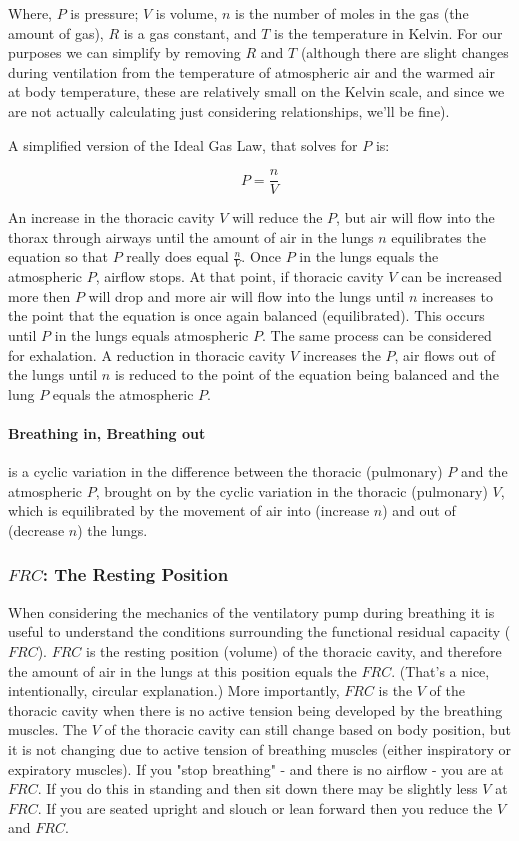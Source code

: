 Where, $P$ is pressure; $V$ is volume, $n$ is the number of moles in the gas (the amount of gas), $R$ is a gas constant, and $T$ is the temperature in Kelvin. For our purposes we can simplify by removing $R$ and $T$ (although there are slight changes during ventilation from the temperature of atmospheric air and the warmed air at body temperature, these are relatively small on the Kelvin scale, and since we are not actually calculating just considering relationships, we'll be fine).

A simplified version of the Ideal Gas Law, that solves for $P$ is:

\begin{equation}
    P = \frac{n}{V}
\end{equation}

An increase in the thoracic cavity $V$ will reduce the $P$, but air will flow into the thorax through airways until the amount of air in the lungs $n$ equilibrates the equation so that $P$ really does equal $\frac{n}{V}$. Once $P$ in the lungs equals the atmospheric $P$, airflow stops. At that point, if thoracic cavity $V$ can be increased more then $P$ will drop and more air will flow into the lungs until $n$ increases to the point that the equation is once again balanced (equilibrated). This occurs until $P$ in the lungs equals atmospheric $P$. 
The same process can be considered for exhalation. A reduction in thoracic cavity $V$ increases the $P$, air flows out of the lungs until $n$ is reduced to the point of the equation being balanced and the lung $P$ equals the atmospheric $P$. 

\paragraph{Breathing in, Breathing out} is a cyclic variation in the difference between the thoracic (pulmonary) $P$ and the atmospheric $P$, brought on by the cyclic variation in the thoracic (pulmonary) $V$, which is equilibrated by the movement of air into (increase $n$) and out of (decrease $n$) the lungs.

\subsubsection{$FRC$: The Resting Position}

When considering the mechanics of the ventilatory pump during breathing it is useful to understand the conditions surrounding the functional residual capacity ($FRC$). $FRC$ is the resting position (volume) of the thoracic cavity, and therefore the amount of air in the lungs at this position equals the $FRC$. (That's a nice, intentionally, circular explanation.) 
More importantly, $FRC$ is the $V$ of the thoracic cavity when there is no active tension being developed by the breathing muscles. The $V$ of the thoracic cavity can still change based on body position, but it is not changing due to active tension of breathing muscles (either inspiratory or expiratory muscles). If you "stop breathing" - and there is no airflow - you are at $FRC$. If you do this in standing and then sit down there may be slightly less $V$ at $FRC$. If you are seated upright and slouch or lean forward then you reduce the $V$ and $FRC$. 

